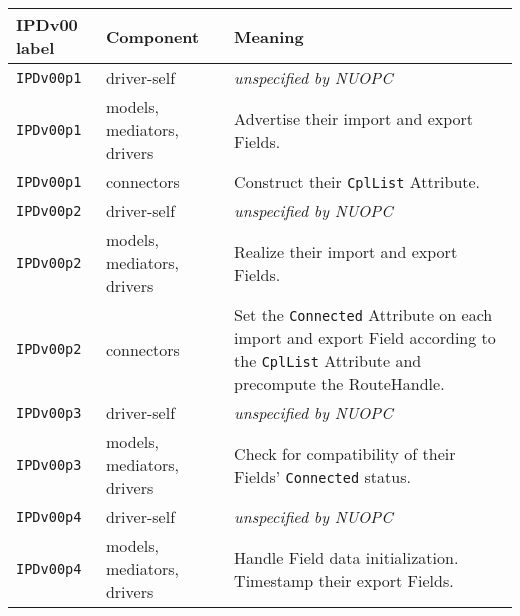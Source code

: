 \vspace*{2ex}
\begin{longtable}[h]{|p{35mm}|p{4cm}|p{6cm}|}
     \hline\hline
     {\bf IPDv00 label} & {\bf Component} & {\bf Meaning}\\
     \hline\hline
     {\tt IPDv00p1} & driver-self                 & {\em unspecified by NUOPC}\\ \hline
     {\tt IPDv00p1} & models, mediators, drivers  & Advertise their import and export Fields.\\ \hline
     {\tt IPDv00p1} & connectors                  & Construct their {\tt CplList} Attribute.\\ \hline
     {\tt IPDv00p2} & driver-self                 & {\em unspecified by NUOPC}\\ \hline
     {\tt IPDv00p2} & models, mediators, drivers  & Realize their import and export Fields.\\ \hline
     {\tt IPDv00p2} & connectors                  & Set the {\tt Connected} Attribute on each import and export Field according to the {\tt CplList} Attribute and precompute the RouteHandle.\\ \hline
     {\tt IPDv00p3} & driver-self                 & {\em unspecified by NUOPC}\\ \hline
     {\tt IPDv00p3} & models, mediators, drivers  & Check for compatibility of their Fields' {\tt Connected} status.\\ \hline
     {\tt IPDv00p4} & driver-self                 & {\em unspecified by NUOPC}\\ \hline
     {\tt IPDv00p4} & models, mediators, drivers  & Handle Field data initialization. Timestamp their export Fields.\\
     \hline\hline
\end{longtable}

